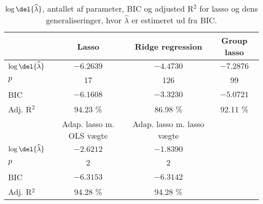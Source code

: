 \begin{table}
\center
\begin{tabular}{lccc} 
\toprule
& \multicolumn{1}{c}{Lasso} & \multicolumn{1}{c}{Ridge regression}  &  \multicolumn{1}{c}{Group lasso}\\ \midrule
$\log \del{\widehat{\lambda}}$ & $-6.2639$ & $-4.4730$  & $-7.2876$ \\
$p$ & 17 & 126 & 99 \\
BIC & $-6.1608 $& $-3.3230$ & $-5.0721$  \\
Adj. R$^2$ & 94.23 \% & 86.98  \%   & 92.11 \%  \\ \bottomrule \toprule
& Adap. lasso m. OLS vægte & Adap. lasso m. lasso vægte \\ \midrule
$\log \del{ \widehat{\lambda}}$ &  $-2.6212$& $-1.8390$ \\
$p$ & 2&2 \\
BIC &  $-6.3153$&$-6.3142$ \\
Adj. R$^2$ & 94.28 \% &  94.28 \% \\ \bottomrule
 \end{tabular}
\caption{$\log \del{ \widehat\lambda}$, antallet af parameter, BIC og adjusted R$^2$ for lasso og dens generaliseringer, hvor $\widehat{\lambda}$ er estimeret ud fra BIC.} \label{tab:bic_lambda}
\end{table}